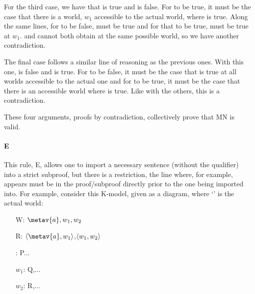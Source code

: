 For the third case, we have that \ediamond\enot{} is true and  \enot\ebox{} is false. For \ediamond\enot{} to be true, it must be the case that there is a world, $w_1$ accessible to the actual world, where \enot{} is true. Along the same lines, for  \enot\ebox{} to be false, \ebox{} must be true and for that to be true,  must be true at $w_1$. \enot{} and  cannot both obtain at the same possible world, so we have another contradiction. 

The final case follows a similar line of reasoning as the previous ones. With this one, \ediamond\enot{} is false and  \enot\ebox{} is true. For \ediamond\enot{} to be false, it must be the case that  is true at all worlds accessible to the actual one and for \enot\ebox{} to be true, it must be the case that there is an accessible world where \enot{} is true. Like with the others, this is a contradiction. 

These four arguments, proofs by contradiction, collectively prove that MN is valid. 


\paragraph{\ebox E}
This rule, \ebox E, allows one to import a necessary sentence (without the qualifier) into a strict subproof, but there is a restriction, the line where, for example, \ebox{} appears must be in the proof/subproof directly prior to the one being imported into. For example, consider this K-model, given as a diagram, where `' is the actual world:

\begin{center}
\end{center}
\begin{itemize}
\item[W:] $\metav{a},w_1,w_2$
\item[R:]$\openntuple \metav{a},w_1\closentuple$,$\langle w_1,w_2\rangle$  
\item[\metav{a}:] P... 
\item[$w_1$:] Q,...
\item[$w_2$:] R,...
\end{itemize}

